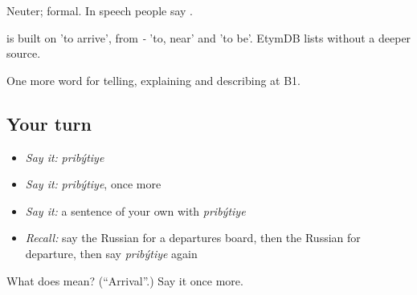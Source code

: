 Neuter; formal. In speech people say \emph{}.

\begin{cousinweb}
\emph{} is built on \emph{} 'to arrive', from \emph{-} 'to, near' and \emph{} 'to be'. EtymDB lists \emph{} without a deeper source.
\end{cousinweb}

\begin{grammarlens}[title={What you've built}]
One more word for telling, explaining and describing at B1.
\end{grammarlens}

\subsection*{Your turn}
\begin{itemize}
\raggedright
  \item \emph{Say it:} \emph{pribýtiye}
  \item \emph{Say it:} \emph{pribýtiye}, once more
  \item \emph{Say it:} a sentence of your own with \emph{pribýtiye}
  \item \emph{Recall:} say the Russian for a departures board, then the Russian for departure, then say \emph{pribýtiye} again
\end{itemize}

\begin{tcolorbox}[breakable,colback=teal!4,colframe=teal!35!black,title={Before you move on}]
What does  mean? (\textquotedblleft{}Arrival\textquotedblright{}.) Say it once more.
\end{tcolorbox}

